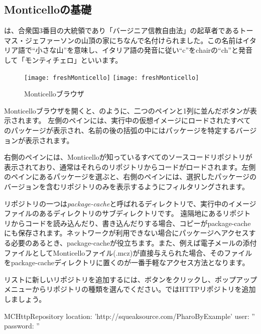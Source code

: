 \documentclass[a4paper,10pt,twoside]{book}
\begin{document}
\subsection{Monticelloの基礎}

は、合衆国3番目の大統領であり「バージニア信教自由法」の起草者であるトーマス・ジェファーソンの山頂の家にちなんで名付けられました。この名前はイタリア語で``小さな山''を意味し、イタリア語の発音に従い``c''をchairの``ch''と発音して「モンティチェロ」といいます。


\begin{figure}[btp]
\begin{center}
\ifluluelse
{\texttt{[image: freshMonticello]}}
{\texttt{[image: freshMonticello]}}
\end{center}
\caption{Monticelloブラウザ}
\end{figure}

Monticelloブラウザを開くと、のように、二つのペインと1列に並んだボタンが表示されます。
左側のペインには、実行中の仮想イメージにロードされたすべてのパッケージが表示され、名前の後の括弧の中にはパッケージを特定するバージョンが表示されます。

右側のペインには、Monticelloが知っているすべてのソースコードリポジトリが表示されており、通常はそれらのリポジトリからコードがロードされます。左側のペインにあるパッケージを選ぶと、右側のペインには、選択したパッケージのバージョンを含むリポジトリのみを表示するようにフィルタリングされます。

リポジトリの一つは\emph{package-cache}と呼ばれるディレクトリで、実行中のイメージファイルのあるディレクトリのサブディレクトリです。
遠隔地にあるリポジトリからコードを読み込んだり、書き込んだりする場合、コピーがpackage-cacheにも保存されます。ネットワークが利用できない場合にパッケージへアクセスする必要のあるとき、package-cacheが役立ちます。また、例えば電子メールの添付ファイルとしてMonticelloファイル(.mcz)が直接与えられた場合、そのファイルをpackage-cacheディレクトリに置くのが一番手軽なアクセス方法となります。

リストに新しいリポジトリを追加するには、ボタンをクリックし、ポップアップメニューからリポジトリの種類を選んでください。ではHTTPリポジトリを追加しましょう。

\begin{code}{}
MCHttpRepository
location: 'http://squeaksource.com/PharoByExample'
user: ''
password: ''
\end{code}
\end{document}
